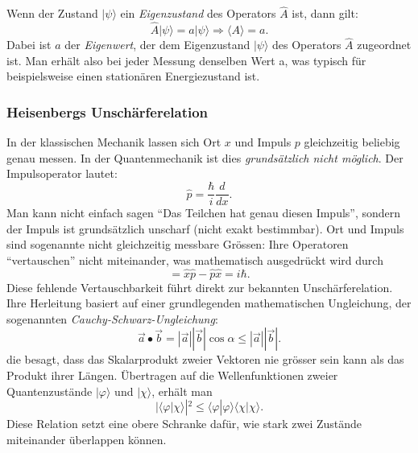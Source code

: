 		Wenn der Zustand $|\psi\rangle$ ein \emph{Eigenzustand} des Operators $\hat{A}$ ist, dann gilt:
		\begin{equation}
			\hat{A} | \psi \rangle = a | \psi \rangle \Rightarrow \langle A \rangle = a.
		\end{equation}
		Dabei ist $a$ der \emph{Eigenwert}, der dem Eigenzustand $|\psi\rangle$ des Operators $\hat{A}$ zugeordnet ist. 
		Man erhält also bei jeder Messung denselben Wert a, was typisch für beispielsweise einen stationären Energiezustand ist.

	\subsubsection{Heisenbergs Unschärferelation%
	\label{fourier:subsubsection:unschaerferelation}}
		In der klassischen Mechanik lassen sich Ort $x$ und Impuls $p$ gleichzeitig beliebig genau messen.
		In der Quantenmechanik ist dies \emph{grundsätzlich nicht möglich}.
		Der Impulsoperator lautet:
		\begin{equation}
			\hat{p} = \frac{\hbar}{i} \frac{d}{dx}.
		\end{equation}
		Man kann nicht einfach sagen ``Das Teilchen hat genau diesen Impuls'', sondern der Impuls ist grundsätzlich unscharf (nicht exakt bestimmbar).
		Ort und Impuls sind sogenannte nicht gleichzeitig messbare Grössen:
		Ihre Operatoren ``vertauschen'' nicht miteinander, was mathematisch ausgedrückt wird durch
		\begin{equation}
			[\hat{x},\hat{p}] = \hat{x} \hat{p} - \hat{p} \hat{x} = i \hbar.
		\end{equation}
		Diese fehlende Vertauschbarkeit führt direkt zur bekannten Unschärferelation.
		Ihre Herleitung basiert auf einer grundlegenden mathematischen Ungleichung, der sogenannten \emph{Cauchy-Schwarz-Ungleichung}:
		\begin{equation}\label{fourier:equation:CauchySchwarzUngleichung}
			\vec{a} \bullet \vec{b} = |\vec{a}| |\vec{b}|\cos\alpha \le |\vec{a}| |\vec{b}|.
		\end{equation}
		die besagt, dass das Skalarprodukt zweier Vektoren nie grösser sein kann als das Produkt ihrer Längen.
		Übertragen auf die Wellenfunktionen zweier Quantenzustände $|\varphi\rangle$ und $|\chi\rangle$, erhält man
		\begin{equation}
			|\langle\varphi | \chi\rangle|^2 \le \langle\varphi | \varphi\rangle \langle\chi | \chi\rangle.
		\end{equation}
		Diese Relation setzt eine obere Schranke dafür, wie stark zwei Zustände miteinander überlappen können.
